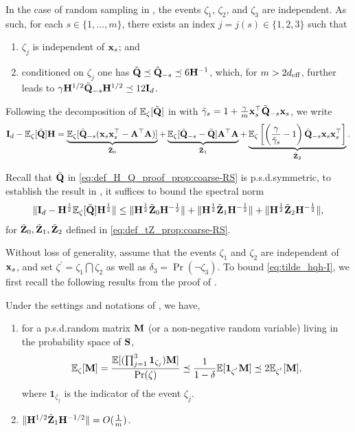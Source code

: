 \documentclass[11pt,a4paper]{article}
\begin{document}
In the case of random sampling in , the events $\zeta_1$, $\zeta_2$, and $\zeta_3$ are independent.  
As such, for each $s\in \{1,\ldots, m\}$, there exists an index $j=j(s)\in\{1,2,3\}$ such that
\begin{enumerate}
    \item $  \zeta_j$ is independent of $\x_{s}$; and 
    \item conditioned on $  \zeta_j$ one has $\tilde \Q\preceq\tilde \Q_{-s}\preceq6\H^{-1}$, which, for $m>2 d_{\eff}$, further leads to $\gamma \H^{1/2}\tilde \Q_{-s} \H^{1/2} \preceq 12 \I_d$.
\end{enumerate}


Following the decomposition of $\EE_{\zeta} [\tilde\Q]$ in \citet{derezinski2021newtonless,derezinski2021sparse} with $\tilde \gamma_s=1+\frac{\gamma}{m}\x_s^\top\tilde\Q_{-s}\x_s$, we write
\begin{equation}\label{eq:def_tZ_prop:coarse-RS}
\I_d-\EE_{\zeta} [\tilde\Q]\H =\underbrace{\EE_{\zeta}[\tilde\Q_{-s}(\x_s\x_s^\top-\A^\top\A)]}_{\tilde\Z_0} +\underbrace{\EE_{\zeta}[\tilde\Q_{-s}-\tilde\Q]\A^\top\A}_{\tilde\Z_1}
+\underbrace{\EE_{\zeta}\left[\left(\frac{\gamma}{\tilde \gamma_s}-1\right)\tilde\Q_{-s}\x_s\x_s^\top    \right]}_{\tilde\Z_2}.
\end{equation} 


Recall that $\tilde \Q$ in \eqref{eq:def_H_Q_proof_prop:coarse-RS} is p.s.d.\@ symmetric, to establish the result in , it suffices to bound the spectral norm
\begin{align}\label{eq:tilde_hqh-I}
    \|\I_d-\H^{\frac{1}{2}}\EE_{\zeta} [\tilde\Q]\H^{\frac{1}{2}}\|
    \leq \|\H^{\frac{1}{2}}\tilde\Z_0\H^{-\frac{1}{2}}\|
    +\|\H^{\frac{1}{2}}\tilde\Z_1\H^{-\frac{1}{2}}\|+\|\H^{\frac{1}{2}}\tilde\Z_2\H^{-\frac{1}{2}}\|,
\end{align}
for $\tilde \Z_0, \tilde \Z_1, \tilde \Z_2$ defined in \eqref{eq:def_tZ_prop:coarse-RS}.

Without loss of generality, assume that the events $\zeta_1$ and $\zeta_2$ are independent of $\x_{s}$, and set $\zeta^{'} =\zeta_1\bigcap \zeta_2$  as well as $\delta_3=\Pr(\neg\zeta_3)$. 
To bound \eqref{eq:tilde_hqh-I}, we first recall the following results from the proof of \citet{derezinski2021newtonless,derezinski2021sparse}.

\begin{lemma}
Under the settings and notations of , we have,
\begin{enumerate}
  \item for a p.s.d.\@ random matrix $\M$ (or a non-negative random variable) living in the probability space of $\S$, 
\begin{align}
    \EE_{\zeta}[\M]=\frac{\EE[(\prod^3_{j=1}\mathbf{1}_{\zeta_j})\M]}{\Pr(\zeta)} \preceq \frac{1}{1-\delta}  \EE[\mathbf{1}_{\zeta^{'}}\M] \preceq 2 \EE_{\zeta^{'}}[\M], \label{eq:condition_expec_three}
\end{align}
where $\mathbf{1}_{\zeta_j}$ is the indicator of the event $\zeta_j$.
  \item $\|\H^{1/2}\tilde\Z_1\H^{-1/2}\|=O(\frac{1}{m})$.
\end{enumerate}
\end{lemma}
\end{document}

